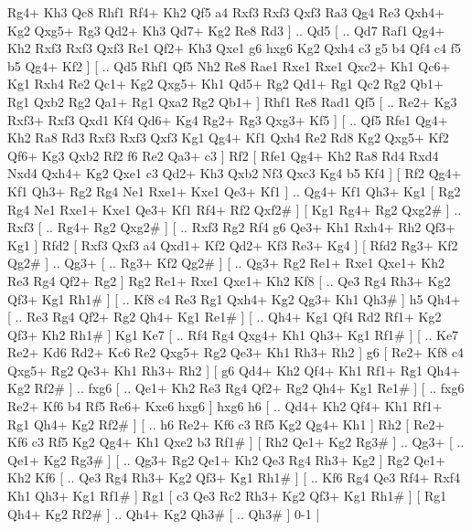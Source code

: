 Rg4+  Kh3 Qc8  Rhf1 Rf4+  Kh2 Qf5  a4 Rxf3  Rxf3 Qxf3  Ra3 Qg4  Re3 Qxh4+  Kg2 Qxg5+  Rg3 Qd2+  Kh3 Qd7+  Kg2 Re8  Rd3   ] .. Qd5 [ .. Qd7  Raf1 Qg4+  Kh2 Rxf3  Rxf3 Qxf3  Re1 Qf2+  Kh3 Qxe1  g6 hxg6  Kg2 Qxh4  c3 g5  b4 Qf4  c4 f5  b5 Qg4+  Kf2   ]  [ .. Qd5  Rhf1 Qf5  Nh2 Re8  Rae1 Rxe1  Rxe1 Qxc2+  Kh1 Qc6+  Kg1 Rxh4  Re2 Qc1+  Kg2 Qxg5+  Kh1 Qd5+  Rg2 Qd1+  Rg1 Qc2  Rg2 Qb1+  Rg1 Qxb2  Rg2 Qa1+  Rg1 Qxa2  Rg2 Qb1+   ]  Rhf1   Re8    Rad1   Qf5 [ .. Re2+  Kg3 Rxf3+  Rxf3 Qxd1  Kf4 Qd6+  Kg4 Rg2+  Rg3 Qxg3+  Kf5   ]  [ .. Qf5  Rfe1 Qg4+  Kh2 Ra8  Rd3 Rxf3  Rxf3 Qxf3  Kg1 Qg4+  Kf1 Qxh4  Re2 Rd8  Kg2 Qxg5+  Kf2 Qf6+  Kg3 Qxb2  Rf2 f6  Re2 Qa3+  c3   ]  Rf2 [  Rfe1 Qg4+  Kh2 Ra8  Rd4 Rxd4  Nxd4 Qxh4+  Kg2 Qxe1  c3 Qd2+  Kh3 Qxb2  Nf3 Qxc3  Kg4 b5  Kf4   ]  [  Rf2 Qg4+  Kf1 Qh3+  Rg2 Rg4  Ne1 Rxe1+  Kxe1 Qe3+  Kf1   ] .. Qg4+    Kf1   Qh3+    Kg1 [  Rg2 Rg4  Ne1 Rxe1+  Kxe1 Qe3+  Kf1 Rf4+  Rf2 Qxf2#   ]  [  Kg1 Rg4+  Rg2 Qxg2#   ] .. Rxf3 [ .. Rg4+  Rg2 Qxg2#   ]  [ .. Rxf3  Rg2 Rf4  g6 Qe3+  Kh1 Rxh4+  Rh2 Qf3+  Kg1   ]  Rfd2 [  Rxf3 Qxf3  a4 Qxd1+  Kf2 Qd2+  Kf3 Re3+  Kg4   ]  [  Rfd2 Rg3+  Kf2 Qg2#   ] .. Qg3+ [ .. Rg3+  Kf2 Qg2#   ]  [ .. Qg3+  Rg2 Re1+  Rxe1 Qxe1+  Kh2 Re3  Rg4 Qf2+  Rg2   ]  Rg2   Re1+    Rxe1  Qxe1+    Kh2  Kf8 [ .. Qe3  Rg4 Rh3+  Kg2 Qf3+  Kg1 Rh1#   ]  [ .. Kf8  c4 Re3  Rg1 Qxh4+  Kg2 Qg3+  Kh1 Qh3#   ]  h5   Qh4+ [ .. Re3  Rg4 Qf2+  Rg2 Qh4+  Kg1 Re1#   ]  [ .. Qh4+  Kg1 Qf4  Rd2 Rf1+  Kg2 Qf3+  Kh2 Rh1#   ]  Kg1  Ke7 [ .. Rf4  Rg4 Qxg4+  Kh1 Qh3+  Kg1 Rf1#   ]  [ .. Ke7  Re2+ Kd6  Rd2+ Kc6  Re2 Qxg5+  Rg2 Qe3+  Kh1 Rh3+  Rh2   ]  g6 [  Re2+ Kf8  c4 Qxg5+  Rg2 Qe3+  Kh1 Rh3+  Rh2   ]  [  g6 Qd4+  Kh2 Qf4+  Kh1 Rf1+  Rg1 Qh4+  Kg2 Rf2#   ] .. fxg6 [ .. Qe1+  Kh2 Re3  Rg4 Qf2+  Rg2 Qh4+  Kg1 Re1#   ]  [ .. fxg6  Re2+ Kf6  b4 Rf5  Re6+ Kxe6  hxg6   ]  hxg6   h6 [ .. Qd4+  Kh2 Qf4+  Kh1 Rf1+  Rg1 Qh4+  Kg2 Rf2#   ]  [ .. h6  Re2+ Kf6  c3 Rf5  Kg2 Qg4+  Kh1   ]  Rh2 [  Re2+ Kf6  c3 Rf5  Kg2 Qg4+  Kh1 Qxe2  b3 Rf1#   ]  [  Rh2 Qe1+  Kg2 Rg3#   ] .. Qg3+ [ .. Qe1+  Kg2 Rg3#   ]  [ .. Qg3+  Rg2 Qe1+  Kh2 Qe3  Rg4 Rh3+  Kg2   ]  Rg2   Qe1+    Kh2  Kf6 [ .. Qe3  Rg4 Rh3+  Kg2 Qf3+  Kg1 Rh1#   ]  [ .. Kf6  Rg4 Qe3  Rf4+ Rxf4  Kh1 Qh3+  Kg1 Rf1#   ]  Rg1 [  c3 Qe3  Rc2 Rh3+  Kg2 Qf3+  Kg1 Rh1#   ]  [  Rg1 Qh4+  Kg2 Rf2#   ] .. Qh4+    Kg2  Qh3#    [ .. Qh3#   ] 0-1  |
